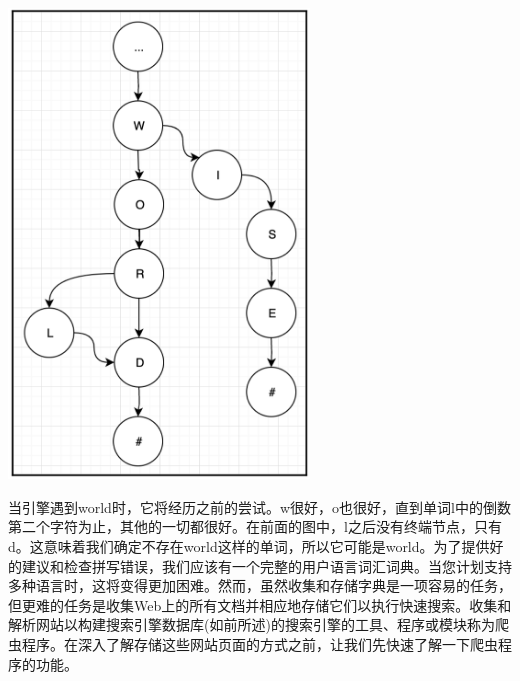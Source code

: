 \begin{center}
	\includegraphics[width=0.6\textwidth]{content/Section-3/Chapter-16/6}
\end{center}

当引擎遇到world时，它将经历之前的尝试。w很好，o也很好，直到单词l中的倒数第二个字符为止，其他的一切都很好。在前面的图中，l之后没有终端节点，只有d。这意味着我们确定不存在world这样的单词，所以它可能是world。为了提供好的建议和检查拼写错误，我们应该有一个完整的用户语言词汇词典。当您计划支持多种语言时，这将变得更加困难。然而，虽然收集和存储字典是一项容易的任务，但更难的任务是收集Web上的所有文档并相应地存储它们以执行快速搜索。收集和解析网站以构建搜索引擎数据库(如前所述)的搜索引擎的工具、程序或模块称为爬虫程序。在深入了解存储这些网站页面的方式之前，让我们先快速了解一下爬虫程序的功能。 \par

